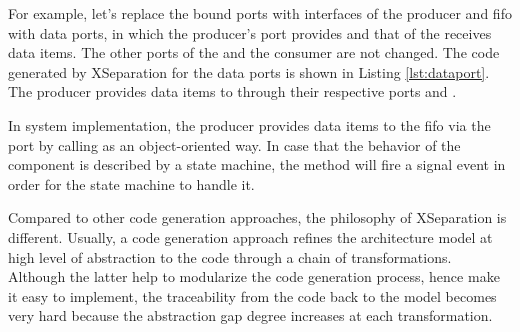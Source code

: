 For example, let's replace the bound ports with interfaces of the producer and fifo with data ports, in which the producer's port provides and that of the  receives data items.
The other ports of the  and the consumer are not changed.
The code generated by XSeparation for the data ports is shown in Listing \ref{lst:dataport}.
The  producer provides data items to  through their respective ports  and .

\begin{minipage}{\columnwidth}
	
\end{minipage} 

In system implementation, the producer provides data items to the fifo via the port  by calling  as an object-oriented way.
In case that the behavior of the component is described by a state machine, the  method will fire a signal event in order for the state machine to handle it.


\vskip 0.1cm
\noindent
{}
Compared to other code generation approaches, the philosophy of XSeparation is different.
Usually, a code generation approach refines the architecture model at high level of abstraction to the code through a chain of transformations.
Although the latter help to modularize the code generation process, hence make it easy to implement, the traceability from the code back to the model becomes very hard because the abstraction gap degree increases at each transformation.

